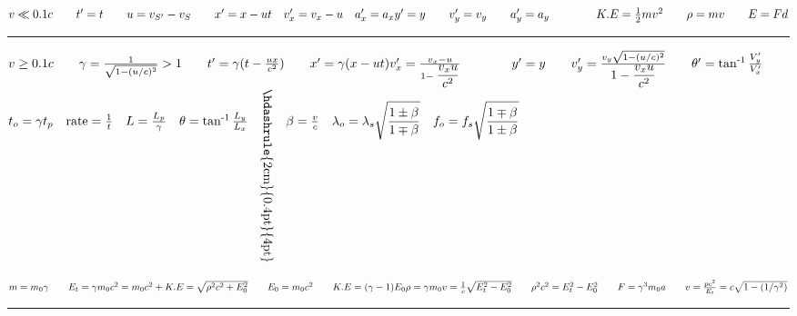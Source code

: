 \documentclass[a4paper,12pt]{article}
\newcommand{\sz}{\text{-}}
\begin{document}

\fontsize{13}{14}\selectfont

\noindent
$
v \ll 0.1c \qquad t^\prime = t \qquad u = v_{S^\prime} - v_S \qquad x^\prime = x - ut \quad v^\prime_x = v_x - u \quad a_x^\prime = a_x \\[+2mm]
y^\prime = y \qquad v^\prime_y = v_y \qquad a_y^\prime = a_y \qquad \qquad K.E = \frac{1}{2} mv^2 \qquad \rho = mv \qquad E = F d
$

{\centering \rule{15cm}{0.4pt} \par}

\noindent
$
v \ge 0.1c \qquad \gamma = \frac{1}{\sqrt{1- (u/c)^2}} > 1 \qquad t^\prime = \gamma (t - \frac{ux}{c^2}) \qquad
x^\prime = \gamma(x - ut)\\ v^\prime_x = \frac{v_x - u}{1 - \displaystyle \frac{v_x u}{c^2} } \qquad \qquad  y^\prime = y \qquad v^\prime_y = \frac{v_y \sqrt{1-(u/c)^2}}{\displaystyle 1- \frac{v_x u}{c^2}} \qquad \theta^\prime = \tan^{\sz 1}{\frac{V_y^\prime}{V_x^\prime}} \\[-3mm]
$

{\centering \hdashrule{15cm}{0.4pt}{4pt} \par}

\noindent
$ t_o = \gamma t_p \quad \text{rate} = \frac{1}{t} \quad L = \frac{L_p}{\gamma} \quad \theta = \tan^{\sz1}{\frac{L_y}{L_x}} \quad \rotatebox{-90}{\hskip-1cm\hdashrule{2cm}{0.4pt}{4pt}} \quad
\beta = \frac{v}{c} \quad \lambda_o = \lambda_s \displaystyle \sqrt{\frac{1\pm \beta}{1\mp \beta}} \quad f_o = f_s \displaystyle \sqrt{\frac{1\mp \beta}{1\pm \beta}}\\[-1em]
$

{\centering \hdashrule{15cm}{0.4pt}{4pt} \par}

\noindent
$ m = m_0 \gamma \qquad E_t = \gamma m_0c^2 = m_0c^2 + K.E = \sqrt{\rho^2 c^2 + E_0^2} \qquad E_0 = m_0 c^2 \qquad K.E = (\gamma - 1) E_0 \\[+2mm]
\rho = \gamma m_0v = \frac{1}{c} \sqrt{E_t^2 - E_0^2} \qquad \rho^2c^2 = E_t^2 - E_0^2 \qquad F = \gamma^3 m_0 a \qquad v = \frac{p c^2}{E_t} = c \sqrt{1- (1/\gamma^2)} $\\[-1em]

{\centering \rule{15cm}{0.4pt} \par}
\end{document}
